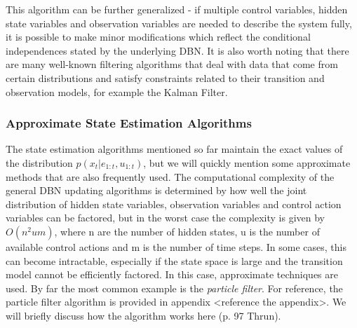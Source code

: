 


This algorithm can be further generalized - if multiple control variables, hidden state variables and observation variables are needed to describe the system fully, it is possible to make minor modifications which reflect the conditional independences stated by the underlying DBN. It is also worth noting that there are many well-known filtering algorithms that deal with data that come from certain distributions and satisfy constraints related to their transition and observation models, for example the Kalman Filter.







\subsubsection{Approximate State Estimation Algorithms}
The state estimation algorithms mentioned so far maintain the exact values of the distribution $p(x_t | e_{1:t}, u_{1:t})$, but we will quickly mention some approximate methods that are also frequently used. The computational complexity of the general DBN updating algorithms is determined by how well the joint distribution of hidden state variables, observation variables and control action variables can be factored, but in the worst case the complexity is given by $O(n^2um)$, where n are the number of hidden states, u is the number of available control actions and m is the number of time steps. In some cases, this can become intractable, especially if the state space is large and the transition model cannot be efficiently factored. In this case, approximate techniques are used. By far the most common example is the \textit{particle filter}. For reference, the particle filter algorithm is provided in appendix <reference the appendix>. We will briefly discuss how the algorithm works here (p. 97 Thrun).

